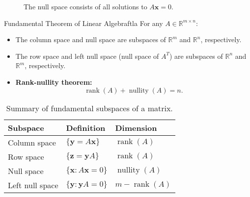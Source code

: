 \begin{figure}[H]
    \centering
    \caption{The null space consists of all solutions to \(A\mathbf{x}=0\).}
\end{figure}

\begin{theorem}{Fundamental Theorem of Linear Algebra}{ftla}
    For any \(A\in\mathbb{R}^{m\times n}\):
    \begin{itemize}[nosep]
        \item The column space and null space are subspaces of \(\mathbb{R}^m\) and \(\mathbb{R}^n\), respectively.
        \item The row space and left null space (null space of \(A^T\)) are subspaces of \(\mathbb{R}^n\) and \(\mathbb{R}^m\), respectively.
        \item \textbf{Rank-nullity theorem:}
              \[
                  \operatorname{rank}(A) + \operatorname{nullity}(A) = n.
              \]
    \end{itemize}
\end{theorem}

\begin{table}[H]
    \centering
    \renewcommand{\arraystretch}{1.2}
    \begin{tabular}{l|l|l}
        \textbf{Subspace} & \textbf{Definition}                & \textbf{Dimension}            \\
        \hline
        Column space      & \(\{\mathbf{y} = A\mathbf{x}\}\)   & \(\operatorname{rank}(A)\)    \\
        Row space         & \(\{\mathbf{z} = \mathbf{y}A\}\)   & \(\operatorname{rank}(A)\)    \\
        Null space        & \(\{\mathbf{x} : A\mathbf{x}=0\}\) & \(\operatorname{nullity}(A)\) \\
        Left null space   & \(\{\mathbf{y} : \mathbf{y}A=0\}\) & \(m-\operatorname{rank}(A)\)  \\
    \end{tabular}
    \caption{Summary of fundamental subspaces of a matrix.}
\end{table}

